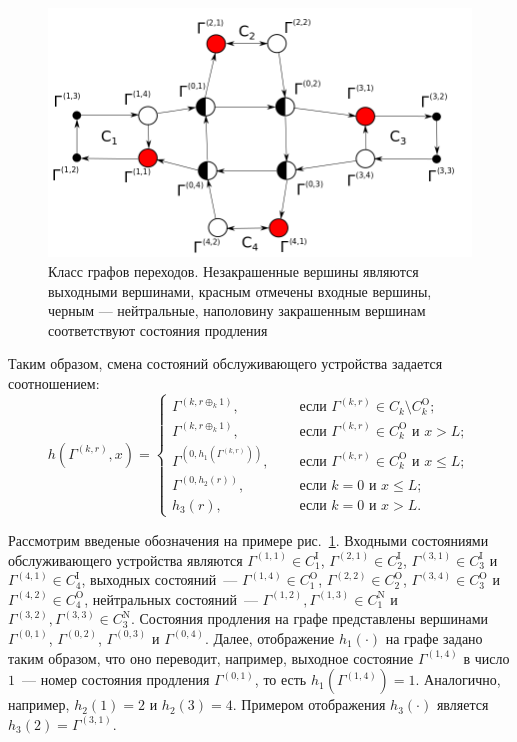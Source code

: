 \documentclass[a4paper,12pt,russian]{extarticle}
\newcommand{\ga}[1]{\Gamma^{\left( #1 \right)} }
\begin{document}
\begin{figure}[hb]\centering
\includegraphics[scale=0.5]{GraphScheme3.png} 
\caption{Класс графов переходов. Незакрашенные вершины являются выходными вершинами, красным отмечены входные вершины, черным --- нейтральные, наполовину закрашенным вершинам соответствуют состояния продления}
\label{GraphScheme}
\end{figure}

Таким образом, смена состояний обслуживающего устройства задается соотношением:
\begin{equation}
h(\ga{k,r},x) = 
\begin{cases}
\ga{k,r\oplus_k 1},& \quad \text{ если } \ga{k,r}\in C_k\setminus C_k^{\mathrm{O}};\\
\ga{k,r\oplus_k 1},& \quad \text{ если } \ga{k,r}\in C_k^{\mathrm{O}} \text{ и } x>L;\\
\ga{0,h_1(\ga{k,r})},& \quad \text{ если } \ga{k,r}\in C_k^{\mathrm{O}} \text{ и } x\leqslant L;\\
\ga{0,h_2(r)},& \quad \text{ если } k=0 \text{ и } x\leqslant L;\\
h_3(r),& \quad \text{ если } k=0 \text{ и } x > L.
\end{cases}
\label{hLaw}
\end{equation}

Рассмотрим введеные обозначения на примере рис.~\ref{GraphScheme}. Входными состояниями обслуживающего устройства 	являются $\ga{1,1} \in C_1^{\mathrm{I}}$, $\ga{2,1} \in C_2^{\mathrm{I}}$, $\ga{3,1} \in C_3^{\mathrm{I}}$ и $\ga{4,1} \in C_4^{\mathrm{I}}$, выходных состояний~--- $\ga{1,4} \in C_1^{\mathrm{O}}$, $\ga{2,2} \in C_2^{\mathrm{O}}$, $\ga{3,4} \in C_3^{\mathrm{O}}$ и $\ga{4,2} \in C_4^{\mathrm{O}}$, нейтральных состояний~--- $\ga{1,2}, \ga{1,3} \in C_1^{\mathrm{N}}$ и $\ga{3,2}, \ga{3,3} \in C_3^{\mathrm{N}}$. Состояния продления на графе представлены вершинами $\ga{0,1}$, $\ga{0,2}$, $\ga{0,3}$ и $\ga{0,4}$. Далее, отображение $h_1(\cdot)$ на графе задано таким образом, что оно переводит, например, выходное состояние $\ga{1,4}$ в число $1$~--- номер состояния продления $\ga{0,1}$, то есть $h_1(\ga{1,4})=1$. Аналогично, например, $h_2(1)=2$ и $h_2(3)=4$. Примером отображения $h_3(\cdot)$ является $h_3(2)=\ga{3,1}$.
\end{document}
